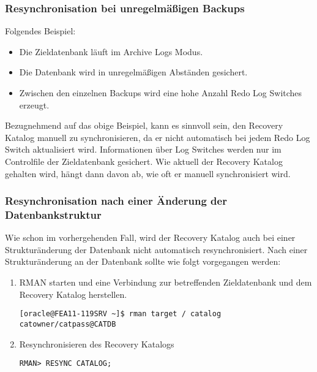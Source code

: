        \subsubsection{Resynchronisation bei unregelmäßigen Backups}
          Folgendes Beispiel:
          \begin{itemize}
            \item Die Zieldatenbank läuft im Archive Logs Modus.
            \item Die Datenbank wird in unregelmäßigen Abständen gesichert.
            \item Zwischen den einzelnen Backups wird eine hohe Anzahl Redo Log Switches erzeugt.
          \end{itemize}
          Bezugnehmend auf das obige Beispiel, kann es sinnvoll sein, den Recovery Katalog manuell zu synchronisieren, da er nicht automatisch bei jedem Redo Log Switch aktualisiert wird. Informationen über Log Switches werden nur im Controlfile der Zieldatenbank gesichert. Wie aktuell der Recovery Katalog gehalten wird, hängt dann davon ab, wie oft er manuell synchronisiert wird.
        \subsubsection{Resynchronisation nach einer Änderung der Datenbankstruktur}
          Wie schon im vorhergehenden Fall, wird der Recovery Katalog auch bei
          einer Struk\-tur\-än\-der\-ung der Datenbank nicht automatisch
          resynchronisiert. Nach einer Strukturänderung an der Datenbank
          sollte wie folgt vorgegangen werden:
          \begin{enumerate}
            \item RMAN starten und eine Verbindung zur betreffenden Zieldatenbank und dem Recovery Katalog herstellen.
              \begin{lstlisting}[caption={Starten des RMAN},label=admin1215,language=rman]
[oracle@FEA11-119SRV ~]$ rman target / catalog catowner/catpass@CATDB
              \end{lstlisting}
            \item Resynchronisieren des Recovery Katalogs
              \begin{lstlisting}[caption={Resynchronisieren des Recovery Katalogs},label=admin1216,language=rman]
RMAN> RESYNC CATALOG;
              \end{lstlisting}
          \end{enumerate}
